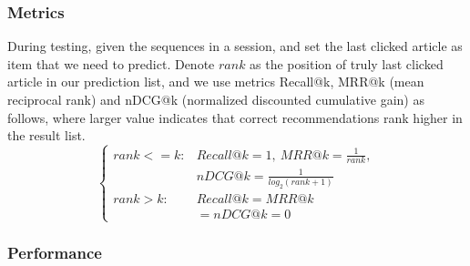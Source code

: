 \subsubsection{Metrics}

During testing, given the sequences in a session, and set the last clicked article as item that we need to predict. Denote $rank$ as the position of truly last clicked article in our prediction list, and we use metrics Recall@k, MRR@k (mean reciprocal rank) and nDCG@k (normalized discounted cumulative gain) as follows, where larger value indicates that correct recommendations rank higher in the result list.
\begin{equation}
  \begin{cases}
      rank<=k:&Recall@k = 1,~MRR@k = \frac{1}{rank},\\
      &nDCG@k = \frac{1}{log_2(rank+1)}\\
      rank>k:&Recall@k =MRR@k\\
      &=nDCG@k=0
  \end{cases}
\end{equation}

\subsubsection{Performance}


